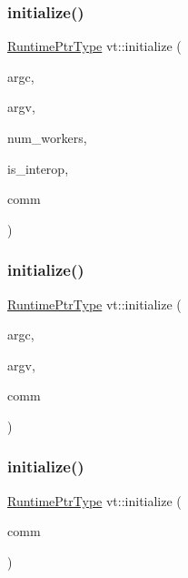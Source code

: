 \subsubsection{\texorpdfstring{initialize()}{initialize()}\hspace{0.1cm}{\footnotesize\ttfamily [1/3]}}
{\footnotesize\ttfamily \hyperlink{namespacevt_a0ce60e0299d8fa32223b3b9ffa0af466}{Runtime\+Ptr\+Type} vt\+::initialize (\begin{DoxyParamCaption}\item[{int \&}]{argc,  }\item[{char $\ast$$\ast$\&}]{argv,  }\item[{\hyperlink{namespacevt_aa93398ea48f2cb6c188512250f7cc248}{Worker\+Count\+Type} const}]{num\+\_\+workers,  }\item[{bool}]{is\+\_\+interop,  }\item[{M\+P\+I\+\_\+\+Comm $\ast$}]{comm }\end{DoxyParamCaption})}

\mbox{\label{namespacevt_adb614f53d39c8e84417ad7aac3265645}} 
\subsubsection{\texorpdfstring{initialize()}{initialize()}\hspace{0.1cm}{\footnotesize\ttfamily [2/3]}}
{\footnotesize\ttfamily \hyperlink{namespacevt_a0ce60e0299d8fa32223b3b9ffa0af466}{Runtime\+Ptr\+Type} vt\+::initialize (\begin{DoxyParamCaption}\item[{int \&}]{argc,  }\item[{char $\ast$$\ast$\&}]{argv,  }\item[{M\+P\+I\+\_\+\+Comm $\ast$}]{comm }\end{DoxyParamCaption})}

\mbox{\label{namespacevt_a9e13ed8a04b3395bbff2f035cae656af}} 
\subsubsection{\texorpdfstring{initialize()}{initialize()}\hspace{0.1cm}{\footnotesize\ttfamily [3/3]}}
{\footnotesize\ttfamily \hyperlink{namespacevt_a0ce60e0299d8fa32223b3b9ffa0af466}{Runtime\+Ptr\+Type} vt\+::initialize (\begin{DoxyParamCaption}\item[{M\+P\+I\+\_\+\+Comm $\ast$}]{comm }\end{DoxyParamCaption})}

